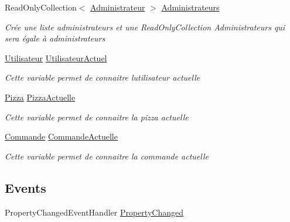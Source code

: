 \begin{DoxyCompactItemize}
Read\+Only\+Collection$<$ \hyperlink{classModele_1_1Administrateur}{Administrateur} $>$ \hyperlink{classModele_1_1Manager_ac8440a9781b104ad429965fcd460bf2f}{Administrateurs}
\begin{DoxyCompactList}\small\item\em Crée une liste administrateurs et une Read\+Only\+Collection Administrateurs qui sera égale à administrateurs \end{DoxyCompactList}\item 
\hyperlink{classModele_1_1Utilisateur}{Utilisateur} \hyperlink{classModele_1_1Manager_aa00c4632bd15b247d6b6793a6797dc82}{Utilisateur\+Actuel}
\begin{DoxyCompactList}\small\item\em Cette variable permet de connaitre l\textquotesingle{}utilisateur actuelle \end{DoxyCompactList}\item 
\hyperlink{classModele_1_1Pizza}{Pizza} \hyperlink{classModele_1_1Manager_a7e69844aeeebbc80144850efc0d2b94c}{Pizza\+Actuelle}
\begin{DoxyCompactList}\small\item\em Cette variable permet de connaitre la pizza actuelle \end{DoxyCompactList}\item 
\hyperlink{classModele_1_1Commande}{Commande} \hyperlink{classModele_1_1Manager_a4b53ccf46b594f580933c26c59892dd7}{Commande\+Actuelle}
\begin{DoxyCompactList}\small\item\em Cette variable permet de connaitre la commande actuelle \end{DoxyCompactList}\end{DoxyCompactItemize}
\subsection*{Events}
\begin{DoxyCompactItemize}
\item 
Property\+Changed\+Event\+Handler \hyperlink{classModele_1_1Manager_aebe3fac90190bcb0f688187821705730}{Property\+Changed}
\end{DoxyCompactItemize}


